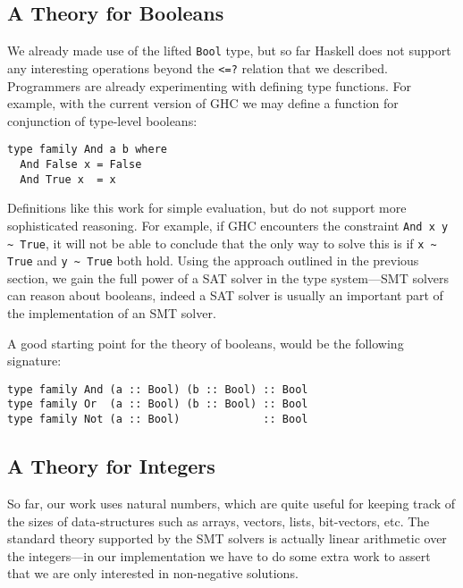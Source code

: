 \documentclass{sigplanconf}
\begin{document}
\subsection{A Theory for Booleans}
We already made use of the lifted \Verb"Bool" type, but so far Haskell
does not support any interesting operations beyond the \Verb"<=?" relation
that we described.  Programmers are already experimenting with defining
type functions. For example, with the current version of GHC we may
define a function for conjunction of type-level booleans:
\begin{Verbatim}
type family And a b where
  And False x = False
  And True x  = x
\end{Verbatim}

Definitions like this work for simple evaluation, but do not support
more sophisticated reasoning.  For example, if GHC encounters
the constraint \Verb"And x y ~ True", it will not be able to conclude
that the only way to solve this is if \Verb"x ~ True" and \Verb"y ~ True"
both hold.  Using the approach outlined in the previous section, we
gain the full power of a SAT solver in the type system---SMT solvers
can reason about booleans, indeed a SAT solver is usually an important
part of the implementation of an SMT solver.

A good starting point for the theory of booleans, would be the following
signature:
\begin{Verbatim}
type family And (a :: Bool) (b :: Bool) :: Bool
type family Or  (a :: Bool) (b :: Bool) :: Bool
type family Not (a :: Bool)             :: Bool
\end{Verbatim}


\subsection{A Theory for Integers}

So far, our work uses natural numbers, which are quite useful for
keeping track of the sizes of data-structures such as arrays, vectors,
lists, bit-vectors, etc.  The standard theory supported by the SMT solvers
is actually linear arithmetic over the integers---in our implementation
we have to do some extra work to assert that we are only interested
in non-negative solutions.
\end{document}
